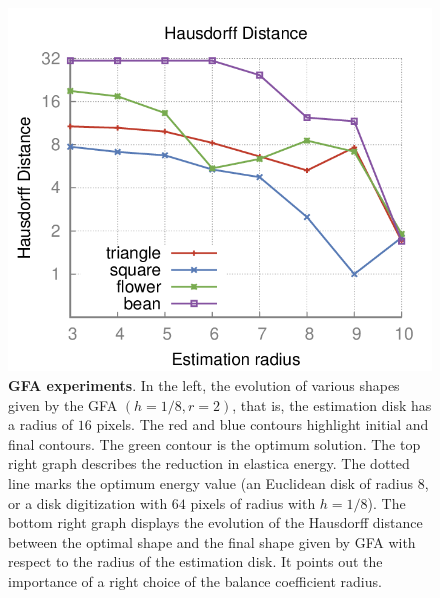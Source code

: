 \documentclass{siamart220329}
\begin{document}
\begin{figure}
\begin{minipage}{0.75\textwidth}
\includegraphics[scale=0.22]{figures/hausdorff-distance/hausdorff-distance-plot.png}
\end{minipage}
\caption{\textbf{GFA experiments}. In the left, the evolution of various
shapes given by the GFA $(h=1/8,r=2)$, that is, the estimation disk has a
radius of $16$ pixels. The red and blue contours highlight initial and final
contours. The green contour is the optimum solution. The top right graph
describes the reduction in elastica energy. The dotted line marks the
optimum energy value (an Euclidean disk of radius $8$, or a disk
digitization with $64$ pixels of radius with $h=1/8$). The bottom right
graph displays the evolution of the Hausdorff distance
between the optimal shape and the final shape given by GFA with respect to 
the radius of the estimation disk. It points out the importance of a 
right choice of the balance coefficient radius.}
\label{fig:graph-flow-experiments}
\end{figure}
\end{document}
